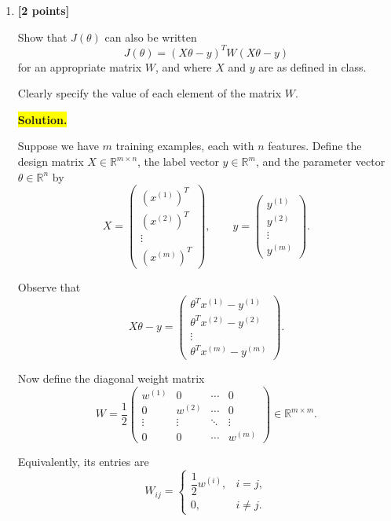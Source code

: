 \documentclass[10pt]{article}
\begin{document}
\begin{enumerate}
\begin{enumerate}[label=(\alph*)]
\begin{enumerate}[label=\roman*.]
\item \textbf{[2 points]}

Show that $J(\theta)$ can also be written
\[
J(\theta)
=
(X\theta-y)^T
W
(X\theta-y)
\]
for an appropriate matrix $W$, and where $X$ and $y$ are as defined
in class.

Clearly specify the value of each element of the matrix $W$.


\medskip
\noindent\colorbox{yellow}{\textbf{Solution.}}
\vspace{3mm}

Suppose we have $m$ training examples, each with $n$ features.
Define the design matrix $X\in\mathbb{R}^{m\times n}$,
the label vector $y\in\mathbb{R}^{m}$, and the parameter
vector $\theta\in\mathbb{R}^{n}$ by
\[
X=
\begin{pmatrix}
(x^{(1)})^T\\
(x^{(2)})^T\\
\vdots\\
(x^{(m)})^T
\end{pmatrix},
\qquad
y=
\begin{pmatrix}
y^{(1)}\\
y^{(2)}\\
\vdots\\
y^{(m)}
\end{pmatrix}.
\]

Observe that
\[
X\theta-y=
\begin{pmatrix}
\theta^Tx^{(1)}-y^{(1)}\\
\theta^Tx^{(2)}-y^{(2)}\\
\vdots\\
\theta^Tx^{(m)}-y^{(m)}
\end{pmatrix}.
\]

Now define the diagonal weight matrix
\[
\boxed{
W=\frac12
\begin{pmatrix}
w^{(1)} & 0 & \cdots & 0\\
0 & w^{(2)} & \cdots & 0\\
\vdots & \vdots & \ddots & \vdots\\
0 & 0 & \cdots & w^{(m)}
\end{pmatrix}
}
\in\mathbb{R}^{m\times m}.
\]

Equivalently, its entries are
\[
W_{ij}=
\begin{cases}
\dfrac12 w^{(i)}, & i=j,\\[2mm]
0, & i\neq j.
\end{cases}
\]


\end{enumerate}
\end{enumerate}
\end{enumerate}
\end{document}

